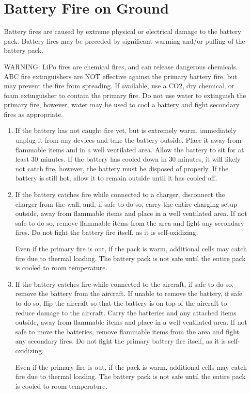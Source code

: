\documentclass{report}
\begin{document}
	\section{Battery Fire on Ground}
		Battery fires are caused by extreme physical or electrical damage to the battery pack.  Battery fires may be preceded by significant warming and/or puffing of the battery pack.
		\begin{mdframed}[linecolor=red,linewidth=4pt]
			WARNING: \gls{LiPo} fires are chemical fires, and can release dangerous chemicals.  ABC fire extinguishers are NOT effective against the primary battery fire, but may prevent the fire from spreading.  If available, use a CO2, dry chemical, or foam extinguisher to contain the primary fire.  Do not use water to extinguish the primary fire, however, water may be used to cool a battery and fight secondary fires as appropriate.
		\end{mdframed}
		\begin{enumerate}
			\item If the battery has not caught fire yet, but is extremely warm, immediately unplug it from any devices and take the battery outside.  Place it away from flammable items and in a well ventilated area. Allow the battery to sit for at least 30 minutes.  If the battery has cooled down in 30 minutes, it will likely not catch fire, however, the battery must be disposed of properly.  If the battery is still hot, allow it to remain outside until it has cooled off.
			\item If the battery catches fire while connected to a charger, disconnect the charger from the wall, and, if safe to do so, carry the entire charging setup outside, away from flammable items and place in a well ventilated area. If not safe to do so, remove flammable items from the area and fight any secondary fires.  Do not fight the battery fire itself, as it is self-oxidizing.

			Even if the primary fire is out, if the pack is warm, additional cells may catch fire due to thermal loading.  The battery pack is not safe until the entire pack is cooled to room temperature.
			\item If the battery catches fire while connected to the aircraft, if safe to do so, remove the battery from the aircraft.  If unable to remove the battery, if safe to do so, flip the aircraft so that the battery is on top of the aircraft to reduce damage to the aircraft.  Carry the batteries and any attached items outside, away from flammable items and place in a well ventilated area.  If not safe to move the batteries, remove flammable items from the area and fight any secondary fires.  Do not fight the primary battery fire itself, as it is self-oxidizing.

			Even if the primary fire is out, if the pack is warm, additional cells may catch fire due to thermal loading.  The battery pack is not safe until the entire pack is cooled to room temperature.
		\end{enumerate}
\end{document}
